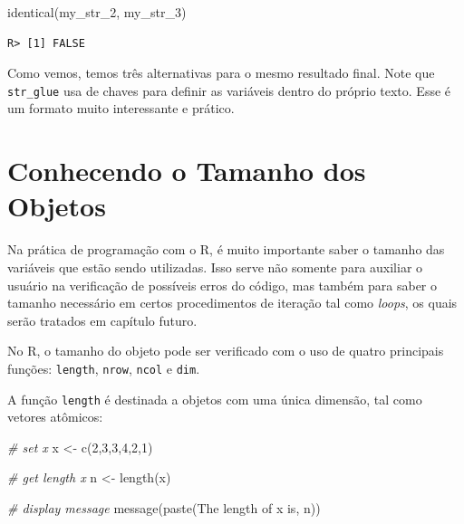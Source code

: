 \documentclass[
  11pt,
]{book}
\newenvironment{Shaded}{\begin{snugshade}}{\end{snugshade}}
\newcommand{\CommentTok}[1]{\textcolor[rgb]{0.37,0.37,0.37}{\textit{#1}}}
\newcommand{\DecValTok}[1]{\textcolor[rgb]{0.06,0.06,0.06}{#1}}
\newcommand{\FunctionTok}[1]{\textcolor[rgb]{0,0,0}{#1}}
\newcommand{\NormalTok}[1]{#1}
\newcommand{\OtherTok}[1]{\textcolor[rgb]{0.37,0.37,0.37}{#1}}
\newcommand{\StringTok}[1]{\textcolor[rgb]{0.5,0.5,0.5}{#1}}
\begin{document}
\begin{Shaded}
\begin{Highlighting}[]
\FunctionTok{identical}\NormalTok{(my\_str\_2, my\_str\_3)}
\end{Highlighting}
\end{Shaded}

\begin{verbatim}
R> [1] FALSE
\end{verbatim}

Como vemos, temos três alternativas para o mesmo resultado final. Note que \texttt{str\_glue} usa de chaves para definir as variáveis dentro do próprio texto. Esse é um formato muito interessante e prático.

\hypertarget{conhecendo-o-tamanho-dos-objetos}{%
\section{Conhecendo o Tamanho dos Objetos}\label{conhecendo-o-tamanho-dos-objetos}}

Na prática de programação com o R, é muito importante saber o tamanho das variáveis que estão sendo utilizadas. Isso serve não somente para auxiliar o usuário na verificação de possíveis erros do código, mas também para saber o tamanho necessário em certos procedimentos de iteração tal como \emph{loops}, os quais serão tratados em capítulo futuro.

No R, o tamanho do objeto pode ser verificado com o uso de quatro principais funções: \texttt{length}, \texttt{nrow}, \texttt{ncol} e \texttt{dim}.    

A função \texttt{length} é destinada a objetos com uma única dimensão, tal como vetores atômicos:

\begin{Shaded}
\begin{Highlighting}[]
\CommentTok{\# set x}
\NormalTok{x }\OtherTok{\textless{}{-}} \FunctionTok{c}\NormalTok{(}\DecValTok{2}\NormalTok{,}\DecValTok{3}\NormalTok{,}\DecValTok{3}\NormalTok{,}\DecValTok{4}\NormalTok{,}\DecValTok{2}\NormalTok{,}\DecValTok{1}\NormalTok{)}

\CommentTok{\# get length x}
\NormalTok{n }\OtherTok{\textless{}{-}} \FunctionTok{length}\NormalTok{(x)}

\CommentTok{\# display message}
\FunctionTok{message}\NormalTok{(}\FunctionTok{paste}\NormalTok{(}\StringTok{\textquotesingle{}The length of x is\textquotesingle{}}\NormalTok{, n))}
\end{Highlighting}
\end{Shaded}
\end{document}
